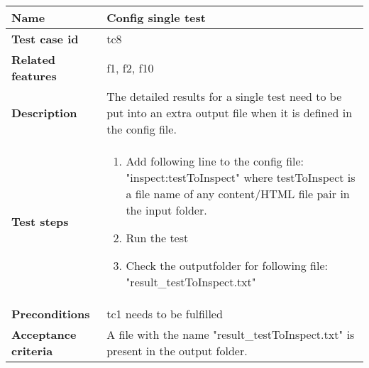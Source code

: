 	\begin{tabular}{ | p{3.5cm} | p{12cm} |}
	\hline
	\textbf{Name} 					& Config single test		\\ 	\hline
	\textbf{Test case id} 			& tc8 						\\ 	\hline
	\textbf{Related features}		& f1, f2, f10						\\ 	\hline
	\textbf{Description} 			& The detailed results for a single test need to be put into an extra output file when it is defined in the config file. \\ 	\hline
	\textbf{Test steps} 			& 	\begin{enumerate}
											\item{Add following line to the config file: "inspect:testToInspect" where testToInspect is a file name of any content/HTML file pair in the input folder. }
											\item{Run the test}
											\item{Check the outputfolder for following file: "result\_testToInspect.txt"}
										\end{enumerate}
																\\ 	\hline
	\textbf{Preconditions} 			& tc1 needs to be fulfilled							\\ 	\hline
	\textbf{Acceptance criteria} 	& A file with the name "result\_testToInspect.txt" is present in the output folder. \\ 	\hline
	\end{tabular} \\